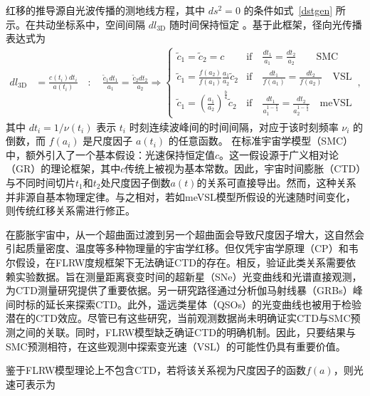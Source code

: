 \documentclass[jkps,preprint,fleqn]{revtex4}
\newcommand{\tc}{\tilde{c}}
\begin{document}
\begin{CJK*}{UTF8}{gbsn}
红移的推导源自光波传播的测地线方程，其中 $ds^2 = 0$ 的条件如式~\eqref{dstgen} 所示。在共动坐标系中，空间间隔 $dl_{3\textrm{D}}$ 随时间保持恒定 \cite{Lee:2024mal,Lee:2024zcu}。基于此框架，径向光传播表达式为
\begin{align}
d l_{3\textrm{D}} &= \frac{c(t_i) dt_i}{a(t_i)} \quad : \quad \frac{\tc_1 dt_1}{a_1} = \frac{\tc_2 dt_2}{a_2} \Rightarrow \begin{cases} \tc_1 = \tc_2 = c & \textrm{if} \quad \frac{dt_1}{a_1} = \frac{dt_2}{a_2} \qquad \textrm{SMC} \\
\tc_1 = \frac{f(a_2)}{f(a_1)} \frac{a_1}{a_2} \tc_2 & \textrm{if} \quad \frac{dt_1}{f(a_1)} = \frac{dt_2}{f(a_2)} \quad \textrm{VSL} \\ \tc_1 = \left( \frac{a_1}{a_2}\right)^{\frac{b}{4}} \tc_2 & \textrm{if} \quad \frac{dt_1}{a_1^{1-\frac{b}{4}}} = \frac{dt_2}{a_2^{1-\frac{b}{4}}} \quad \textrm{meVSL}  \end{cases} \,, \label{dl3D}
\end{align}
其中 $dt_i = 1/\nu(t_i)$ 表示 $t_i$ 时刻连续波峰间的时间间隔，对应于该时刻频率 $\nu_i$ 的倒数，而 $f(a_i)$ 是尺度因子 $a(t_i)$ 的任意函数。
在标准宇宙学模型（SMC）中，额外引入了一个基本假设：光速保持恒定值$c$。这一假设源于广义相对论（GR）的理论框架，其中$c$传统上被视为基本常数。因此，宇宙时间膨胀（CTD）与不同时间切片$t_1$和$t_2$处尺度因子倒数$a(t)$的关系可直接导出。然而，这种关系并非源自基本物理定律。与之相对，若如meVSL模型所假设的光速随时间变化，则传统红移关系需进行修正。

在膨胀宇宙中，从一个超曲面过渡到另一个超曲面会导致尺度因子增大，这自然会引起质量密度、温度等多种物理量的宇宙学红移。但仅凭宇宙学原理（CP）和韦尔假设，在FLRW度规框架下无法确证CTD的存在。相反，验证此类关系需要依赖实验数据。旨在测量距离衰变时间的超新星（SNe）光变曲线和光谱直接观测，为CTD测量研究提供了重要依据\cite{Leibundgut:1996qm,SupernovaSearchTeam:1997gem,Foley:2005qu,Blondin:2007ua,Blondin:2008mz,Lee:2023ucu,DES:2024vgg,Lee:2024kxa}。另一研究路径通过分析伽马射线暴（GRBs）峰间时标的延长来探索CTD\cite{Norris:1993hda,Wijers:1994qf,Band:1994ee,Meszaros:1995gj,Lee:1996zu,Chang:2001fy,Crawford:2009be,Zhang:2013yna,Singh:2021jgr}。此外，遥远类星体（QSOs）的光变曲线也被用于检验潜在的CTD效应\cite{Hawkins:2001be,Dai:2012wp,Lewis:2023jab}。尽管已有这些研究，当前观测数据尚未明确证实CTD与SMC预测之间的关联。同时，FLRW模型缺乏确证CTD的明确机制。因此，只要结果与SMC预测相符，在这些观测中探索变光速（VSL）的可能性仍具有重要价值。

鉴于FLRW模型理论上不包含CTD，若将该关系视为尺度因子的函数$f(a)$，则光速可表示为



\end{CJK*}
\end{document}
